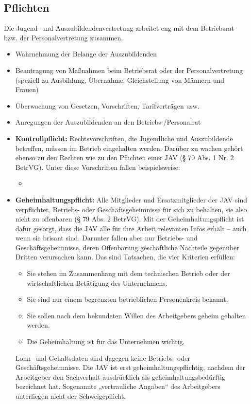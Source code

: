 \subsection{Pflichten}
{
Die Jugend- und Auszubildendenvertretung arbeitet eng mit dem Betriebsrat bzw. der Personalvertretung zusammen. 
}
\newline
\begin{itemize}
	\item  
	Wahrnehmung der Belange der Auszubildenden
	\item
	Beantragung von Maßnahmen beim Betriebsrat oder der Personalvertretung (speziell zu Ausbildung, Übernahme, Gleichstellung von Männern und Frauen)
	\item
	Überwachung von Gesetzen, Vorschriften, Tarifverträgen usw.
	\item
	Anregungen der Auszubildenden an den Betriebs-/Personalrat
	\item
	\textbf{Kontrollpflicht:}
	\newline
	{
		Rechtsvorschriften, die Jugendliche und Auszubildende betreffen, müssen im Betrieb eingehalten werden. \newline 
		Darüber zu wachen gehört ebenso zu den Rechten wie zu den Pflichten einer JAV (§ 70 Abs. 1 Nr. 2 BetrVG). Unter diese Vorschriften fallen beispielsweise:
	}
	\begin{itemize}
		\item 
		
	\end{itemize}
	\item 
	\textbf{Geheimhaltungspflicht:}
	\newline
	{
		Alle Mitglieder und Ersatzmitglieder der JAV sind verpflichtet, Betriebs- oder Geschäftsgeheimnisse für sich zu behalten, sie also nicht zu offenbaren (§ 79 Abs. 2 BetrVG). Mit der Geheimhaltungspflicht ist dafür gesorgt, dass die JAV alle für ihre Arbeit relevanten Infos erhält – auch wenn sie brisant sind.
	 	\newline
	 	Darunter fallen aber nur Betriebs- und Geschäftsgeheimnisse, deren Offenbarung geschäftliche Nachteile gegenüber Dritten verursachen kann. Das sind Tatsachen, die vier Kriterien erfüllen: 
	 }
	\begin{itemize}
		\item 
		Sie stehen im Zusammenhang mit dem technischen Betrieb oder der wirtschaftlichen Betätigung des Unternehmens.
		\item
		Sie sind nur einem begrenzten betrieblichen Personenkreis bekannt.
		\item
		Sie sollen nach dem bekundeten Willen des Arbeitgebers geheim gehalten werden.
		\item
		Die Geheimhaltung ist für das Unternehmen wichtig.
	\end{itemize}
	Lohn- und Gehaltsdaten sind dagegen keine Betriebs- oder Geschäftsgeheimnisse.
	\newline 
	Die JAV ist erst geheimhaltungspflichtig, nachdem der Arbeitgeber den Sachverhalt ausdrücklich als geheimhaltungsbedürftig bezeichnet hat. Sogenannte „vertrauliche Angaben“ des Arbeitgebers unterliegen nicht der Schweigepflicht.
\end{itemize}

